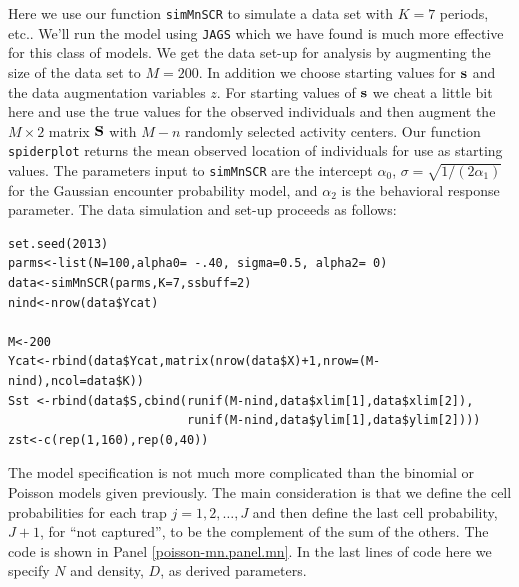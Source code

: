 Here we use our function \mbox{\tt simMnSCR} to simulate a data set
with $K=7$ periods, etc.. We'll run the model using \mbox{\tt JAGS}
which we have found is much more effective for this class of models.
We get the data set-up for analysis by augmenting the size of the data
set to $M=200$. In addition we choose starting values for ${\bf s}$
and the data augmentation variables $z$.  For starting values of ${\bf
  s}$ we cheat a little bit here and use the true values for the
observed individuals and then augment the $M \times 2$ matrix ${\bf
  S}$ with $M-n$ randomly selected activity centers. Our function
\mbox{\tt spiderplot} returns the mean observed location of
individuals for use as starting values.  The parameters input to
\mbox{\tt simMnSCR} are the intercept $\alpha_{0}$, $\sigma =
\sqrt{1/(2\alpha_{1})}$ for the Gaussian encounter probability model,
and $\alpha_{2}$ is the behavioral response parameter. The data
simulation and set-up proceeds as follows:

{\small
\begin{verbatim}
set.seed(2013)
parms<-list(N=100,alpha0= -.40, sigma=0.5, alpha2= 0)
data<-simMnSCR(parms,K=7,ssbuff=2)
nind<-nrow(data$Ycat)

M<-200
Ycat<-rbind(data$Ycat,matrix(nrow(data$X)+1,nrow=(M-nind),ncol=data$K))
Sst <-rbind(data$S,cbind(runif(M-nind,data$xlim[1],data$xlim[2]),
                         runif(M-nind,data$ylim[1],data$ylim[2])))
zst<-c(rep(1,160),rep(0,40))
\end{verbatim}
}

The model specification is not much more complicated than the binomial
or Poisson models given previously. The main consideration is that we
define the cell probabilities for each trap $j=1,2,\dots,J$ and then
define the last cell probability, $J+1$, for ``not captured'', to be
the complement of the sum of the others. The code is shown in Panel
\ref{poisson-mn.panel.mn}.  In the last lines of code here we specify
$N$ and density, $D$, as derived parameters.


